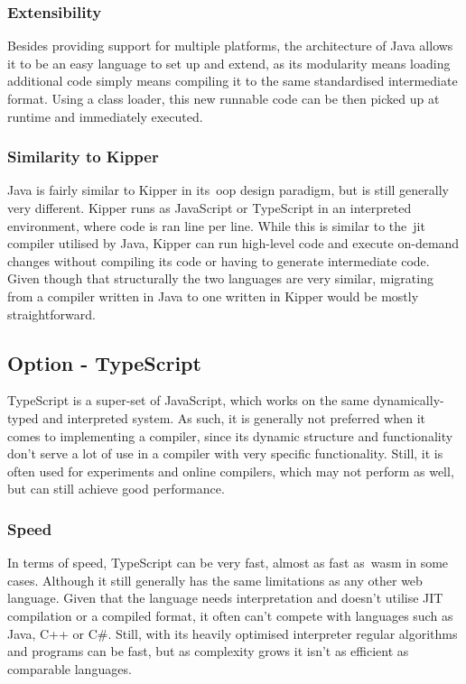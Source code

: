 \subsubsection{Extensibility}

Besides providing support for multiple platforms, the architecture of Java allows it to be an easy language to set up and extend, as its modularity means loading additional code simply means compiling it to the same standardised intermediate format. Using a class loader, this new runnable code can be then picked up at runtime and immediately executed.
 
\subsubsection{Similarity to Kipper}

Java is fairly similar to Kipper in its~\acrshort{oop} design paradigm, but is still generally very different. Kipper runs as JavaScript or TypeScript in an interpreted environment, where code is ran line per line. While this is similar to the~\acrshort{jit} compiler utilised by Java, Kipper can run high-level code and execute on-demand changes without compiling its code or having to generate intermediate code. Given though that structurally the two languages are very similar, migrating from a compiler written in Java to one written in Kipper would be mostly straightforward.

\subsection{Option - TypeScript}

TypeScript is a super-set of JavaScript, which works on the same dynamically-typed and interpreted system. As such, it is generally not preferred when it comes to implementing a compiler, since its dynamic structure and functionality don't serve a lot of use in a compiler with very specific functionality. Still, it is often used for experiments and online compilers, which may not perform as well, but can still achieve good performance.

\subsubsection{Speed}

In terms of speed, TypeScript can be very fast, almost as fast as~\acrshort{wasm} in some cases. Although it still generally has the same limitations as any other web language. Given that the language needs interpretation and doesn't utilise JIT compilation or a compiled format, it often can't compete with languages such as Java, C++ or C\#. Still, with its heavily optimised interpreter regular algorithms and programs can be fast, but as complexity grows it isn't as efficient as comparable languages.

